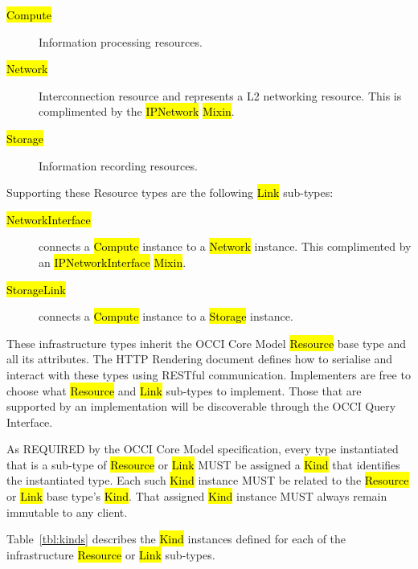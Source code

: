 \documentclass[10pt,a4paper]{article}
\begin{document}
\begin{description}
	\item[\hl{Compute}] Information processing resources.
	\item[\hl{Network}] Interconnection resource and represents a L2 networking resource. 
	This is complimented by the \hl{IPNetwork} \hl{Mixin}.
	\item[\hl{Storage}] Information recording resources.
\end{description}

Supporting these Resource types are the following \hl{Link} sub-types:

\begin{description}
	\item[\hl{NetworkInterface}] connects a \hl{Compute} instance to a \hl{Network} instance. 
	This complimented by an \hl{IPNetworkInterface} \hl{Mixin}.
	\item[\hl{StorageLink}] connects a \hl{Compute} instance to a \hl{Storage} instance.
\end{description}

These infrastructure types inherit the OCCI Core Model \hl{Resource} base type and all its 
attributes. The HTTP Rendering document \cite{occi:http_rendering} defines how to serialise and interact with these types 
using RESTful communication. Implementers are free to choose what \hl{Resource} and 
\hl{Link} sub-types to implement. Those that are supported by an implementation will be 
discoverable through the OCCI Query Interface.

As REQUIRED by the OCCI Core Model specification, every type instantiated that is 
a sub-type of \hl{Resource} or \hl{Link} MUST be assigned a \hl{Kind} that identifies the instantiated 
type. Each such \hl{Kind} instance MUST be related to the \hl{Resource} or \hl{Link} base type's \hl{Kind}. 
That assigned \hl{Kind} instance MUST always remain immutable to any client.

Table~\ref{tbl:kinds} describes the \hl{Kind} instances defined for each of the infrastructure \hl{Resource} 
or \hl{Link} sub-types.
\end{document}
